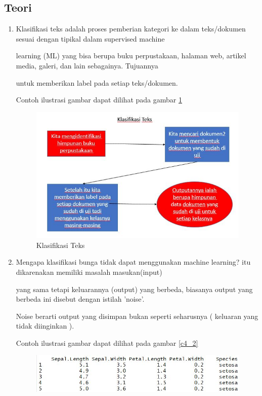 \subsection{Teori}
\begin{enumerate}
\item Klasifikasi teks adalah proses pemberian kategori ke dalam teks/dokumen sesuai dengan tipikal dalam supervised machine
\par learning (ML) yang bisa berupa buku perpustakaan, halaman web, artikel media, galeri, dan lain sebagainya. Tujuannya 
\par untuk memberikan label pada setiap teks/dokumen.
\par Contoh ilustrasi gambar dapat dilihat pada gambar \ref{c4_1}
\begin{figure}[!htbp]
	\centerline{\includegraphics[width=1\textwidth]{figures/huda/chapter4/1.JPG}}
	\caption{Klasifikasi Teks}
	\label{c4_1}
\end{figure}
\item Mengapa klasifikasi bunga tidak dapat menggunakan machine learning? itu dikarenakan memiliki masalah masukan(input) 
\par yang sama tetapi keluarannya (output) yang berbeda, biasanya output yang berbeda ini disebut dengan istilah 'noise'.
\par Noise berarti output yang disimpan bukan seperti seharusnya ( keluaran yang tidak diinginkan ). 
\par Contoh ilustrasi gambar dapat dilihat pada gambar \ref{c4_2}
\begin{figure}[!htbp]
	\centerline{\includegraphics[width=1\textwidth]{figures/huda/chapter4/2.JPG}}

\end{figure}
\end{enumerate}
